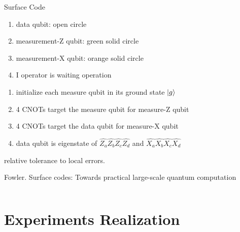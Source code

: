 \documentclass[aspectratio=169,10pt]{beamer}
\begin{document}
\begin{frame}
\begin{columns}
\begin{column}{0.6\textwidth}
            \begin{block}{Surface Code}
            \begin{enumerate}
                \item data qubit: open circle
                \item measurement-Z qubit: green solid circle
                \item measurement-X qubit: orange solid circle
                \item I operator is waiting operation
            \end{enumerate}
            \begin{enumerate}
                \item initialize each measure qubit in its ground state $\ket{g}$
                \item 4 CNOTs target the measure qubit for measure-Z qubit
                \item 4 CNOTs target the data qubit for measure-X qubit
                \item data qubit is eigenstate of $\hat{Z_a}\hat{Z_b}\hat{Z_c}\hat{Z_d}$ and $\hat{X_a}\hat{X_b}\hat{X_c}\hat{X_d}$ 
            \end{enumerate}
            relative tolerance to local errors.
        \end{block}
        \tiny{Fowler. Surface codes: Towards practical large-scale quantum computation}
        \end{column}
    \end{columns}
\end{frame}
\section{Experiments Realization}
\end{document}
